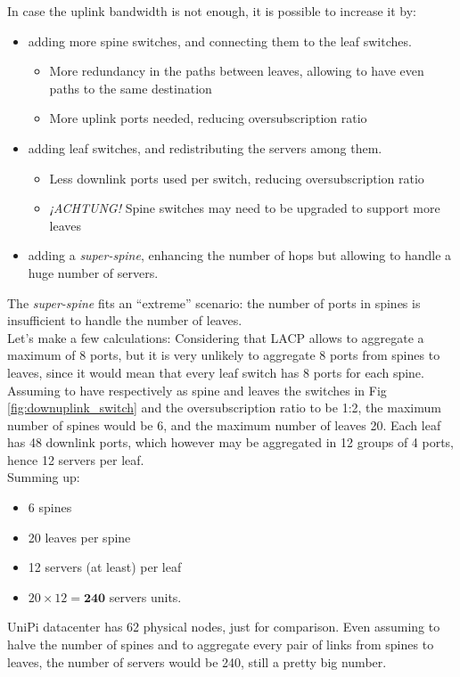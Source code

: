 In case the uplink bandwidth is not enough, it is possible to increase it by:
\begin{itemize}
   \item  adding more spine switches, and connecting them to the leaf switches.
   \begin{itemize}
      \item More redundancy in the paths between leaves, allowing to have even paths to the same destination
      \item More uplink ports needed, reducing oversubscription ratio
   \end{itemize}
   \item adding leaf switches, and redistributing the servers among them.
   \begin{itemize}
      \item Less downlink ports used per switch, reducing oversubscription ratio
      \item \textit{¡ACHTUNG!} Spine switches may need to be upgraded to support more leaves
   \end{itemize}
   \item adding a \textit{super-spine}, enhancing the number of hops but allowing to handle a huge number of servers.
\end{itemize}
The \textit{super-spine} fits an ``extreme'' scenario: the number of ports in spines is insufficient to handle the number of leaves.\\
Let's make a few calculations:
Considering that LACP allows to aggregate a maximum of 8 ports, but it is very unlikely to aggregate 8 ports from spines to leaves, since it would mean that every leaf switch has 8 ports for each spine.\\
Assuming to have respectively as spine and leaves the switches in Fig \ref{fig:downuplink_switch} and the oversubscription ratio to be 1:2, the maximum number of spines would be 6, and the maximum number of leaves 20.
Each leaf has 48 downlink ports, which however may be aggregated in 12 groups of 4 ports, hence 12 servers per leaf.\\
Summing up:
\begin{itemize}
   \item 6 spines
   \item 20 leaves per spine
   \item 12 servers (at least) per leaf
   \item $20 \times 12 = \textbf{240}$ servers units.
\end{itemize}
UniPi datacenter has 62 physical nodes, just for comparison.
Even assuming to halve the number of spines and to aggregate every pair of links from spines to leaves, the number of servers would be 240, still a pretty big number.

